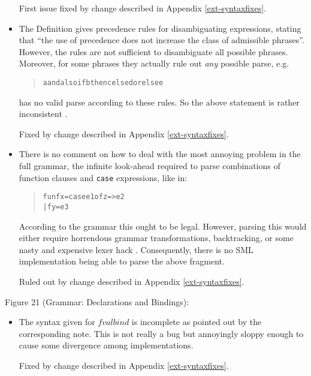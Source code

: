 \documentclass[twoside,titlepage]{article}
\begin{document}
\begin{appendix}
\begin{itemize}
First issue fixed by change described in Appendix \ref{ext-syntaxfixes}.

\item The Definition gives precedence rules for disambiguating expressions, stating that ``the use of precedence does not increase the class of admissible phrases''. However, the rules are not sufficient to disambiguate all possible phrases. Moreover, for some phrases they actually rule out {\em any} possible parse, e.g.

\begin{quote}
\begin{alltt}
a andalso if b then c else d orelse e
\end{alltt}
\end{quote}

has no valid parse according to these rules. So the above statement is rather inconsistent \cite{mistakes}.

Fixed by change described in Appendix \ref{ext-syntaxfixes}.

\item There is no comment on how to deal with the most annoying problem in the full grammar, the infinite look-ahead required to parse combinations of function clauses and {\tt case} expressions, like in:

\begin{quote}
\begin{alltt}
fun f x = case e1 of z => e2
  | f y = e3
\end{alltt}
\end{quote}

According to the grammar this ought to be legal. However, parsing this would either require horrendous grammar transformations, backtracking, or some nasty and expensive lexer hack \cite{mistakes}. Consequently, there is no SML implementation being able to parse the above fragment.

Ruled out by change described in Appendix \ref{ext-syntaxfixes}.
\end{itemize}


Figure 21 (Grammar: Declarations and Bindings):

\begin{itemize}
\item The syntax given for $\mathit{fvalbind}$ is incomplete as pointed out by the corresponding note. This is not really a bug but annoyingly sloppy enough to cause some divergence among implementations.

Fixed by change described in Appendix \ref{ext-syntaxfixes}.
\end{itemize}



\end{appendix}
\end{document}
